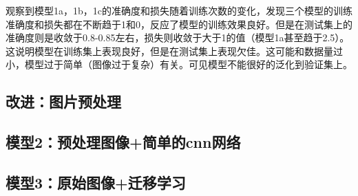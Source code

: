 观察到模型1a，1b，1c的准确度和损失随着训练次数的变化，发现三个模型的训练准确度和损失都在不断趋于1和0，反应了模型的训练效果良好。但是在测试集上的准确度则是收敛于0.8-0.85左右，损失则收敛于大于1的值（模型1a甚至趋于2.5）。这说明模型在训练集上表现良好，但是在测试集上表现欠佳。这可能和数据量过小，模型过于简单（图像过于复杂）有关。可见模型不能很好的泛化到验证集上。






\subsection{改进：图片预处理}

\subsection{模型2：预处理图像+简单的cnn网络}

\subsection{模型3：原始图像+迁移学习}